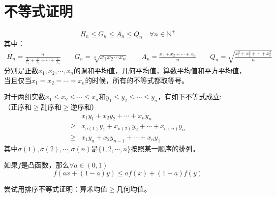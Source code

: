 \section{不等式证明}

\begin{theorem}[均值不等式]
    $$H_n\leq G_n\leq A_n\leq Q_n\quad \forall n \in \mathbb{N}^+$$
    其中：
    \begin{align*}
        H_n = \frac{n}{\frac{1}{x_1}+\frac{1}{x_2}+\cdots+\frac{1}{x_n}} \quad \quad
        G_n = \sqrt[n]{x_1x_2\cdots x_n}                                 \quad \quad
        A_n = \frac{x_1+x_2+\cdots+x_n}{n}                              \quad \quad
        Q_n = \sqrt{\frac{x_1^2+x_2^2+\cdots+x_n^2}{n}}
    \end{align*}
    分别是正数$x_1,x_2,\cdots,x_n$的调和平均值，几何平均值，算数平均值和平方平均值，当且仅当$x_1=x_2=\cdots=x_n$的时候，所有的不等式都取等号。
\end{theorem}

\begin{theorem}[排序不等式]
    对于两组实数$x_1\leq x_2 \leq \cdots \leq x_n$和$y_1\leq y_2 \leq \cdots \leq y_n$，有如下不等式成立:\\
    （正序和$\geq$乱序和$\geq$逆序和）
    \begin{align*}
             & x_1y_1+x_2y_2+\cdots+x_ny_n                               \\
        \geq & x_{\sigma(1)}y_1+x_{\sigma(2)}y_2+\cdots+x_{\sigma(n)}y_n \\
        \geq & x_1y_n+x_2y_{n-1}+\cdots+x_ny_1
    \end{align*}
    其中$\sigma(1),\sigma(2),\cdots,\sigma(n)$是$\{1,2,\cdots,n\}$按照某一顺序的排列。
\end{theorem}

\begin{theorem}[Jensen不等式]
    如果$f$是凸函数，那么$\forall a \in (0,1)$
    $$
        f(ax+(1-a)y) \le af(x)+(1-a)f(y)
    $$
\end{theorem}

\begin{problemset}
    \item 尝试用排序不等式证明：算术均值$\geq$几何均值。
\end{problemset}